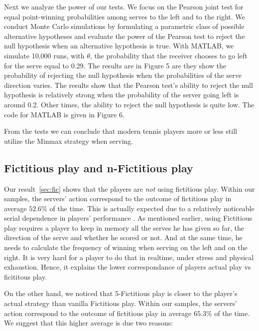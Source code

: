 \documentclass[11pt]{article}
\begin{document}
Next we analyze the power of our tests. We focus on the Pearson joint test for equal point-winning probabilities among serves to the left and to the right. We conduct Monte Carlo simulations by formulating a parametric class of possible alternative hypotheses and evaluate the power of the Pearson test to reject the null hypothesis when an alternative hypothesis is true. With MATLAB, we simulate 10,000 runs, with $\theta$, the probability that the receiver chooses to go left for the serve equal to 0.29. The results are in Figure 5 are they show the probability of rejecting the null hypothesis when the probabilities of the serve direction varies. The results show that the Pearson test’s ability to reject the null hypothesis is relatively strong when the probability of the server going left is around 0.2. Other times, the ability to reject the null hypothesis is quite low. The code for MATLAB is
given in Figure 6.

From the tests we can conclude that modern tennis players more or less still utilize the Minmax strategy when serving.


\subsection{Fictitious play and n-Fictitious play}

Our result~\ref{sec:fic} shows that the players are \emph{not} using fictitious play. Within our samples, the servers' action correspond to the outcome of fictitious play in average $52.6\%$ of the time. This is actually expected due to a relatively noticeable serial dependence in players' performance . As mentioned earlier, using Fictitious play requires a player to keep in memory all the serves he has given so far, the direction of the serve and whether he scored or not. And at the same time, he needs to calculate the frequency of winning when serving on the left and on the right. It is very hard for a player to do that in realtime, under stress and physical exhaustion. Hence, it explains the lower correspondance of players actual play vs ficititous play.

On the other hand, we noticed that 5-Fictitious play is closer to the player's actual strategy than vanilla Fictitious play. Within our samples, the servers' action correspond to the outcome of fictitious play in average $65.3\%$ of the time. We suggest that this higher average is due two reasons:
\end{document}
